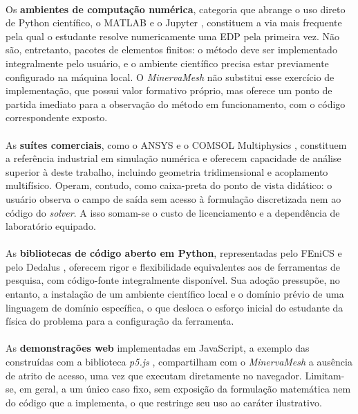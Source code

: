 \paragraph{}Os \textbf{ambientes de computação numérica}, categoria que abrange o uso direto de Python científico, o MATLAB \cite{MATLAB} e o Jupyter \cite{Kluyver2016}, constituem a via mais frequente pela qual o estudante resolve numericamente uma EDP pela primeira vez. Não são, entretanto, pacotes de elementos finitos: o método deve ser implementado integralmente pelo usuário, e o ambiente científico precisa estar previamente configurado na máquina local. O \textit{MinervaMesh} não substitui esse exercício de implementação, que possui valor formativo próprio, mas oferece um ponto de partida imediato para a observação do método em funcionamento, com o código correspondente exposto.

\paragraph{}As \textbf{suítes comerciais}, como o ANSYS \cite{ANSYS} e o COMSOL Multiphysics \cite{COMSOL}, constituem a referência industrial em simulação numérica e oferecem capacidade de análise superior à deste trabalho, incluindo geometria tridimensional e acoplamento multifísico. Operam, contudo, como caixa-preta do ponto de vista didático: o usuário observa o campo de saída sem acesso à formulação discretizada nem ao código do \textit{solver}. A isso somam-se o custo de licenciamento e a dependência de laboratório equipado.

\paragraph{}As \textbf{bibliotecas de código aberto em Python}, representadas pelo FEniCS \cite{Alnaes2015} e pelo Dedalus \cite{Burns2020}, oferecem rigor e flexibilidade equivalentes aos de ferramentas de pesquisa, com código-fonte integralmente disponível. Sua adoção pressupõe, no entanto, a instalação de um ambiente científico local e o domínio prévio de uma linguagem de domínio específica, o que desloca o esforço inicial do estudante da física do problema para a configuração da ferramenta.

\paragraph{}As \textbf{demonstrações web} implementadas em JavaScript, a exemplo das construídas com a biblioteca \textit{p5.js} \cite{P5js}, compartilham com o \textit{MinervaMesh} a ausência de atrito de acesso, uma vez que executam diretamente no navegador. Limitam-se, em geral, a um único caso fixo, sem exposição da formulação matemática nem do código que a implementa, o que restringe seu uso ao caráter ilustrativo.

